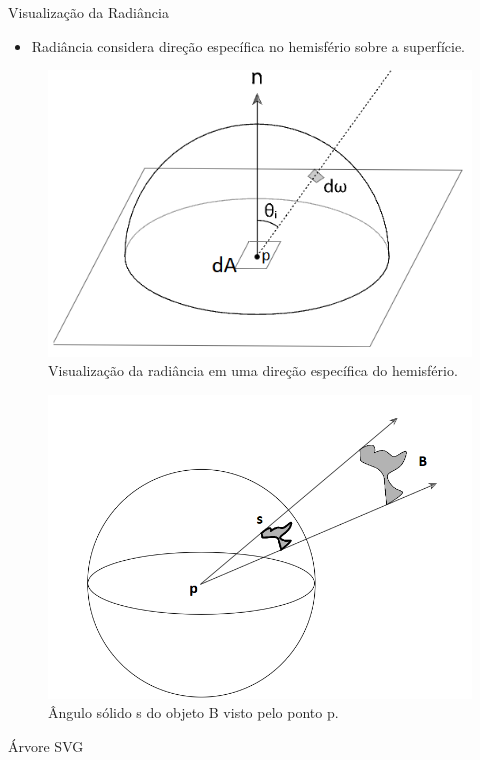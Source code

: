 \begin{frame}{Visualização da Radiância}
    \begin{itemize}
        \item Radiância considera direção específica no hemisfério sobre a superfície.
    \end{itemize}

\begin{figure}[h]
        \caption{\label{radiance-img} \small Visualização da radiância em uma direção específica do hemisfério. }
            \includegraphics[scale=0.5]{./Imagens/irradiance_hemisphere.png}
\end{figure}


\begin{figure}[h]
  \caption{\label{solid-angle} \small   Ângulo sólido s do objeto B visto pelo ponto p. }
            \includegraphics[scale=0.5]{./Imagens/solid_angle.png}
\end{figure}
\end{frame}

\begin{frame}{Árvore SVG}
\end{frame}
